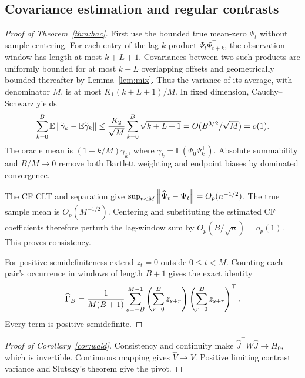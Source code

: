 \documentclass[11pt,a4paper]{article}
\theoremstyle{remark}\newtheorem{remark}[theorem]{Remark}
\newcommand{\E}{\mathbb E}\newcommand{\Pp}{\mathbb P}
\begin{document}
\subsection{Covariance estimation and regular contrasts}\label{proof:covariance}
\begin{proof}[Proof of Theorem~\ref{thm:hac}]
First use the bounded true mean-zero $\Psi_t$ without sample centering. For each entry of the lag-$k$ product $\Psi_t\Psi_{t+k}^\top$, the observation window has length at most $k+L+1$. Covariances between two such products are uniformly bounded for at most $k+L$ overlapping offsets and geometrically bounded thereafter by Lemma~\ref{lem:mix}. Thus the variance of its average, with denominator $M$, is at most $K_1(k+L+1)/M$. In fixed dimension, Cauchy--Schwarz yields
\[
\sum_{k=0}^B\E\norm{\widetilde\gamma_k-\E\widetilde\gamma_k}
\le\frac{K_2}{\sqrt M}\sum_{k=0}^B\sqrt{k+L+1}
=O(B^{3/2}/\sqrt M)=o(1).
\]
The oracle mean is $(1-k/M)\gamma_k$, where $\gamma_k=\E(\Psi_0\Psi_k^\top)$. Absolute summability and $B/M\to0$ remove both Bartlett weighting and endpoint biases by dominated convergence.

The CF CLT and separation give
$\sup_{t<M}\left\lVert\widehat\Psi_t-\Psi_t\right\rVert=O_p(n^{-1/2})$.
The true sample mean is $O_p(M^{-1/2})$. Centering and substituting the estimated CF coefficients therefore perturb the lag-window sum by $O_p(B/\sqrt n)=o_p(1)$. This proves consistency.

For positive semidefiniteness extend $z_t=0$ outside $0\le t<M$. Counting each pair's occurrence in windows of length $B+1$ gives the exact identity
\begin{equation}\label{eq:psd}
\widehat\Gamma_B=\frac1{M(B+1)}\sum_{s=-B}^{M-1}
\left(\sum_{r=0}^Bz_{s+r}\right)\left(\sum_{r=0}^Bz_{s+r}\right)^\top.
\end{equation}
Every term is positive semidefinite.
\end{proof}

\begin{proof}[Proof of Corollary~\ref{cor:wald}]
Consistency and continuity make $\widehat J^\top W\widehat J\to H_0$, which is invertible. Continuous mapping gives $\widehat V\to V$. Positive limiting contrast variance and Slutsky's theorem give the pivot.
\end{proof}
\end{document}
